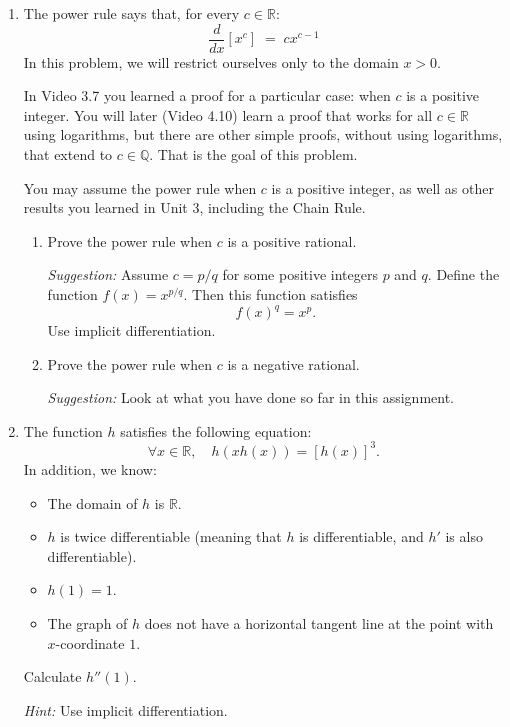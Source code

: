 \documentclass[12pt]{exam}
\newcommand {\DS} [1] {${\displaystyle #1}$}
\newcommand{\vv}{\vspace{.4cm}}
\newcommand{\R}{\mathbb{R}}
\newcommand{\Q}{\mathbb{Q}}
\begin{document}
\begin{enumerate}[resume]
\newpage

\item \label{qu:power}  The power rule says that, for every $c \in \R$:
	$$
		\frac{d}{dx} \left[ x^c \right]  \; = \; c x^{c-1}
	$$
In this problem, we will restrict ourselves only to the domain $x>0$.

In Video 3.7 you learned a proof for a particular case: when $c$ is a positive integer.  You will later (Video 4.10) learn a proof that works for all $c \in \R$ using logarithms, but there are other simple proofs, without using logarithms, that extend to $c \in \Q$.  That is the goal of this problem.
	
You may assume the power rule when $c$ is a positive integer, as well as other results you learned in Unit 3, including the Chain Rule.
	\begin{enumerate}
		\item  Prove the power rule when $c$ is a positive rational.
		
		\emph{Suggestion:}  Assume $c=p/q$ for some positive integers $p$ and $q$.    Define the function $f(x)=x^{p/q}$.  Then this function satisfies
			$$
				f(x)^q = x^p.
			$$
			Use implicit differentiation.
		
		\item  Prove the power rule when $c$ is a negative rational.
		
		\emph{Suggestion:} Look at what you have done so far in this assignment.
	\end{enumerate}

\vv
\newpage

\item   The function $h$ satisfies the following equation:
	$$ \forall x \in \R, \quad h(xh(x)) = \left[ h(x)\right]^3. $$
In addition, we know:
	\begin{itemize}
		\item The domain of $h$ is $\R$.
		\item $h$ is twice differentiable (meaning that $h$ is differentiable, and $h'$ is also differentiable).
		\item $h(1)=1$.
		\item The graph of $h$ does not have a horizontal tangent line at the point with $x$-coordinate $1$.
	\end{itemize}
	
	Calculate \DS{h''(1)}.
	
	\emph{Hint:} Use implicit differentiation.
	\vv
	\\
	

\end{enumerate}
\end{document}
